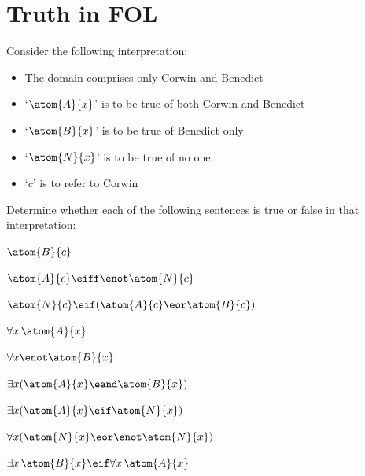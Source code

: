 

\chapter{Truth in FOL}\setcounter{ProbPart}{0}
\problempart
\label{pr.TorF1}
Consider the following interpretation:
	\begin{itemize}
		\item The domain comprises only Corwin and Benedict
		\item `$\atom{A}{x}$' is to be true of both Corwin and Benedict
		\item `$\atom{B}{x}$' is to be true of Benedict only
		\item `$\atom{N}{x}$' is to be true of no one
		\item `$c$' is to refer to Corwin
	\end{itemize}
Determine whether each of the following sentences is true or false in that interpretation:
\begin{compactlist}
\item $\atom{B}{c}$ \hfill {}
\item $\atom{A}{c} \eiff \enot \atom{N}{c}$ \hfill {}
\item $\atom{N}{c} \eif (\atom{A}{c} \eor \atom{B}{c})$ \hfill {}
\item $\forall x\,\atom{A}{x}$ \hfill {}
\item $\forall x \enot \atom{B}{x}$ \hfill {}
\item $\exists x(\atom{A}{x} \eand \atom{B}{x})$ \hfill {}
\item $\exists x(\atom{A}{x} \eif \atom{N}{x})$ \hfill {}
\item $\forall x(\atom{N}{x} \eor \enot \atom{N}{x})$ \hfill {}
\item $\exists x\,\atom{B}{x} \eif \forall x\,\atom{A}{x}$ \hfill {}
\end{compactlist}

